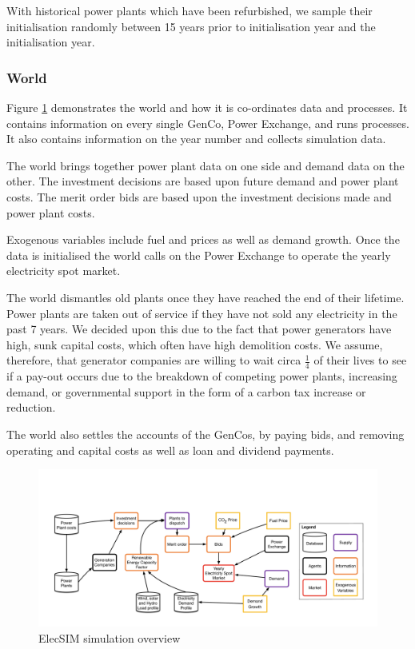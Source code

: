 With historical power plants which have been refurbished, we sample their initialisation randomly between 15 years prior to initialisation year and the initialisation year.

\subsubsection{World}

Figure \ref{fig:lowlevelsystem} demonstrates the world and how it is co-ordinates data and processes. It contains information on every single GenCo, Power Exchange, and runs processes. It also contains information on the year number and collects simulation data.

The world brings together power plant data on one side and demand data on the other. The investment decisions are based upon future demand and power plant costs. The merit order bids are based upon the investment decisions made and power plant costs.

Exogenous variables include fuel and  prices as well as demand growth. Once the data is initialised the world calls on the Power Exchange to operate the yearly electricity spot market.

The world dismantles old plants once they have reached the end of their lifetime. Power plants are taken out of service if they have not sold any electricity in the past 7 years. We decided upon this due to the fact that power generators have high, sunk capital costs, which often have high demolition costs. We assume, therefore, that generator companies are willing to wait circa $\frac{1}{4}$ of their lives to see if a pay-out occurs due to the breakdown of competing power plants, increasing demand, or governmental support in the form of a carbon tax increase or reduction.

The world also settles the accounts of the GenCos, by paying bids, and removing operating and capital costs as well as loan and dividend payments.

\begin{figure}
	\centering
	\includegraphics[width=0.97\linewidth]{figures/low_level_system}
	\caption{ElecSIM simulation overview}
	\label{fig:lowlevelsystem}
\end{figure}



